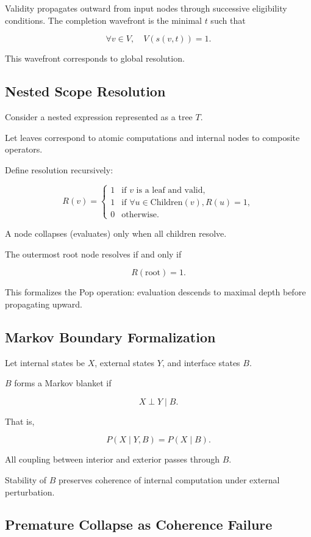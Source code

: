 \documentclass[12pt]{article}
\begin{document}
Validity propagates outward from input nodes through successive eligibility conditions. The completion wavefront is the minimal $t$ such that

\[
\forall v \in V, \quad V(s(v,t)) = 1.
\]

This wavefront corresponds to global resolution.

\subsection{Nested Scope Resolution}

Consider a nested expression represented as a tree $T$.

Let leaves correspond to atomic computations and internal nodes to composite operators.

Define resolution recursively:

\[
R(v) =
\begin{cases}
1 & \text{if } v \text{ is a leaf and valid}, \\
1 & \text{if } \forall u \in \text{Children}(v), R(u)=1, \\
0 & \text{otherwise}.
\end{cases}
\]

A node collapses (evaluates) only when all children resolve.

The outermost root node resolves if and only if

\[
R(\text{root}) = 1.
\]

This formalizes the Pop operation: evaluation descends to maximal depth before propagating upward.

\subsection{Markov Boundary Formalization}

Let internal states be $X$, external states $Y$, and interface states $B$.

$B$ forms a Markov blanket if

\[
X \perp Y \mid B.
\]

That is,

\[
P(X \mid Y, B) = P(X \mid B).
\]

All coupling between interior and exterior passes through $B$.

Stability of $B$ preserves coherence of internal computation under external perturbation.

\subsection{Premature Collapse as Coherence Failure}
\end{document}
